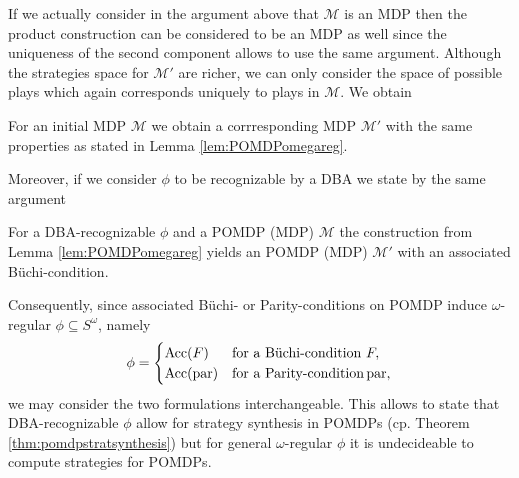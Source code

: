 If we actually consider in the argument above that $\mathcal{M}$ is an \ac{MDP} 
then the product construction can be considered to be an \ac{MDP} as well since 
the uniqueness of the second component allows to use the same argument. 
Although the strategies space for $\mathcal{M'}$ are richer, we can only 
consider the space of possible plays which again corresponds uniquely to plays 
in $\mathcal{M}$. We obtain
\begin{corollary}
  For an initial \ac{MDP} $\mathcal{M}$ we obtain a corrresponding \ac{MDP} 
  $\mathcal{M}'$ with the same properties as stated in Lemma 
  \ref{lem:POMDPomegareg}.
\end{corollary}
Moreover, if we consider $\phi$ to be recognizable by a \ac{DBA} we state by
the same argument
\begin{corollary}
  For a \ac{DBA}-recognizable $\phi$ and a \ac{POMDP} (\ac{MDP}) $\mathcal{M}$
  the construction from Lemma \ref{lem:POMDPomegareg} yields an \ac{POMDP} 
  (\ac{MDP}) $\mathcal{M'}$ with an associated Büchi-condition.
  \label{cor:POMDPDBA}
\end{corollary}
Consequently, since associated Büchi- or Parity-conditions on
\ac{POMDP} induce $\omega$-regular $\phi\subseteq S^{\omega}$, namely
\begin{equation*}
  \phi = 
  \begin{cases}
    \operatorname{Acc}(F)&\text{for a Büchi-condition }F,\\
    \operatorname{Acc}(\operatorname{par})&\text{for a Parity-condition}\operatorname{par},
  \end{cases}
\end{equation*} 
we may consider the two formulations interchangeable. This allows to state that 
\ac{DBA}-recognizable $\phi$ allow for strategy synthesis in \acp{POMDP} (cp.
Theorem \ref{thm:pomdpstratsynthesis}) but for general $\omega$-regular $\phi$ 
it is undecideable to compute strategies for \acp{POMDP}. 

